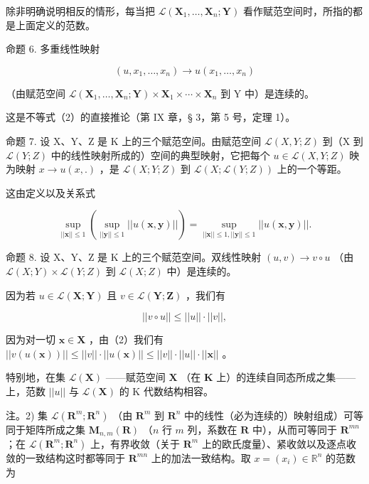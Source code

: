 除非明确说明相反的情形，每当把 \(\mathcal{L}(\mathbf{X}_1,\ldots ,\mathbf{X}_n;\mathbf{Y})\) 看作赋范空间时，所指的都是上面定义的范数。

命题 6. 多重线性映射

\[
(u, x _ {1}, \dots , x _ {n}) \rightarrow u (x _ {1}, \dots , x _ {n})
\]

（由赋范空间 \(\mathcal{L}(\mathbf{X}_{1},\ldots,\mathbf{X}_{n};\mathbf{Y})\times\mathbf{X}_{1}\times\cdots\times\mathbf{X}_{n}\) 到 Y 中）是连续的。

这是不等式（2）的直接推论（第 IX 章，§ 3，第 5 号，定理 1）。

命题 7. 设 X、Y、Z 是 K 上的三个赋范空间。由赋范空间 \(\mathscr{L}(X, Y; Z)\) 到（X 到 \(\mathscr{L}(Y; Z)\) 中的线性映射所成的）空间的典型映射，它把每个 \(u \in \mathscr{L}(X, Y; Z)\) 映为映射 \(x \to u(x, .)\) ，是 \(\mathscr{L}(X; Y; Z)\) 到 \(\mathscr{L}(X; \mathscr{L}(Y; Z))\) 上的一个等距。

这由定义以及关系式

\[
\sup _ {| | \boldsymbol {x} | | \leqslant 1} \left(\sup _ {| | \boldsymbol {y} | | \leqslant 1} | | u (\boldsymbol {x}, \boldsymbol {y}) | |\right) = \sup _ {| | \boldsymbol {x} | | \leqslant 1, | | \boldsymbol {y} | | \leqslant 1} | | u (\boldsymbol {x}, \boldsymbol {y}) | |.
\]

命题 8. 设 X、Y、Z 是 K 上的三个赋范空间。双线性映射 \((u, v) \to v \circ u\) （由 \(\mathcal{L}(X; Y) \times \mathcal{L}(Y; Z)\) 到 \(\mathcal{L}(X; Z)\) 中）是连续的。

因为若 \(u \in \mathcal{L}(\mathbf{X};\mathbf{Y})\) 且 \(v \in \mathcal{L}(\mathbf{Y};\mathbf{Z})\) ，我们有

\[
\left| \left| v \circ u \right| \right| \leqslant \left| \left| u \right| \right| \cdot \left| \left| v \right| \right|,\tag{3}
\]

因为对一切 \(\pmb{x} \in \mathbf{X}\) ，由（2）我们有 \(||v(u(\pmb{x}))|| \leqslant ||v|| \cdot ||u(\pmb{x})|| \leqslant ||v|| \cdot ||u|| \cdot ||\pmb{x}||\) 。

特别地，在集 \(\mathcal{L}(\mathbf{X})\) ——赋范空间 \(\mathbf{X}\) （在 \(\mathbf{K}\) 上）的连续自同态所成之集——上，范数 \(||u||\) 与 \(\mathcal{L}(\mathbf{X})\) 的 K 代数结构相容。

注。2) 集 \(\mathcal{L}(\mathbf{R}^{m};\mathbf{R}^{n})\) （由 \(\mathbf{R}^{m}\) 到 \(\mathbf{R}^{n}\) 中的线性（必为连续的）映射组成）可等同于矩阵所成之集 \(\mathbf{M}_{n,m}(\mathbf{R})\) （\(n\) 行 \(m\) 列，系数在 \(\mathbf{R}\) 中），从而可等同于 \(\mathbf{R}^{mn}\) ；在 \(\mathcal{L}(\mathbf{R}^{m};\mathbf{R}^{n})\) 上，有界收敛（关于 \(\mathbf{R}^{m}\) 上的欧氏度量）、紧收敛以及逐点收敛的一致结构这时都等同于 \(\mathbf{R}^{mn}\) 上的加法一致结构。取 \(x = (x_{i})\in \mathbb{R}^{n}\) 的范数为

